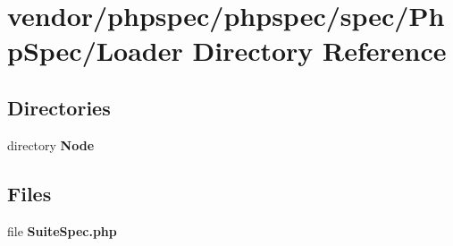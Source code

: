 \section{vendor/phpspec/phpspec/spec/\+Php\+Spec/\+Loader Directory Reference}
\label{dir_0d0ccd3f4286c644c2a02bcdb79fd710}
\subsection*{Directories}
\begin{DoxyCompactItemize}
\item 
directory {\bf Node}
\end{DoxyCompactItemize}
\subsection*{Files}
\begin{DoxyCompactItemize}
\item 
file {\bf Suite\+Spec.\+php}
\end{DoxyCompactItemize}
